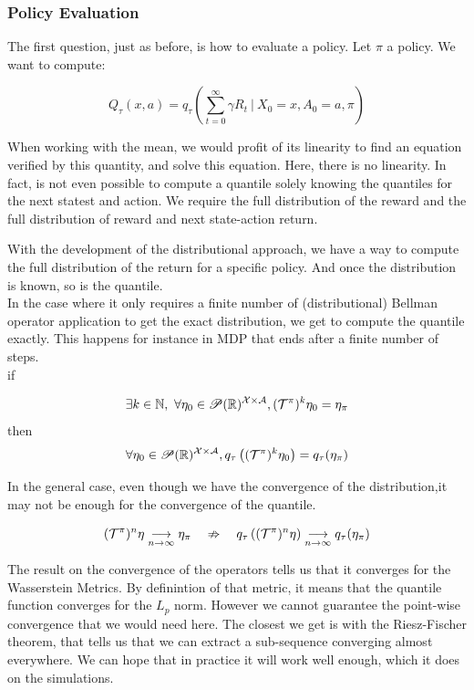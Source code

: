 \subsubsection*{Policy Evaluation}

The first question, just as before, is how to evaluate a policy. Let $\pi$ a policy. We want to compute:

\[ Q_\tau(x,a) = q_\tau\left(\sum_{t = 0}^{\infty} \gamma R_t \ |\ X_0 = x, A_0 = a, \pi\right) \]

When working with the mean, we would profit of its linearity to find an equation verified by this quantity, and solve this equation. Here, there is no linearity. In fact, is not even possible to compute a quantile solely knowing the quantiles for the next statest and action. We require the full distribution of the reward and the full distribution of reward and next state-action return. 

With the development of the distributional approach, we have a way to compute the full distribution of the return for a specific policy. And once the distribution is known, so is the quantile.\\

In the case where it only requires a finite number of (distributional) Bellman operator application to get the exact distribution, we get to compute the quantile exactly. This happens for instance in MDP that ends after a finite number of steps.\\

if

\[\exists k \in \mathbb{N},\ \forall \eta_0 \in \mathscr{P}(\mathbb{R})^{\mathcal{X} \times \mathcal{A}}, (\mathcal{T}^\pi)^k\eta_0 = \eta_\pi \] 
then
\[ \forall \eta_0 \in \mathscr{P}(\mathbb{R})^{\mathcal{X} \times \mathcal{A}}, q_\tau\left((\mathcal{T}^\pi)^k\eta_0\right) = q_\tau(\eta_\pi)\]

In the general case, even though we have the convergence of the distribution,it may not be enough for the convergence of the quantile.

\[ (\mathcal{T}^\pi )^n \eta \underset{n \rightarrow \infty}{\longrightarrow} \eta_\pi \quad \nRightarrow \quad q_\tau\left((\mathcal{T}^\pi )^n \eta\right) \underset{n \rightarrow \infty}{\longrightarrow} q_\tau(\eta_\pi)  \]

The result on the convergence of the operators tells us that it converges for the Wasserstein Metrics. By definintion of that metric, it means that the quantile function converges for the $L_p$ norm. However we cannot guarantee the point-wise convergence that we would need here. The closest we get is with the Riesz-Fischer theorem, that tells us that we can extract a sub-sequence converging almost everywhere. We can hope that in practice it will work well enough, which it does on the simulations.

